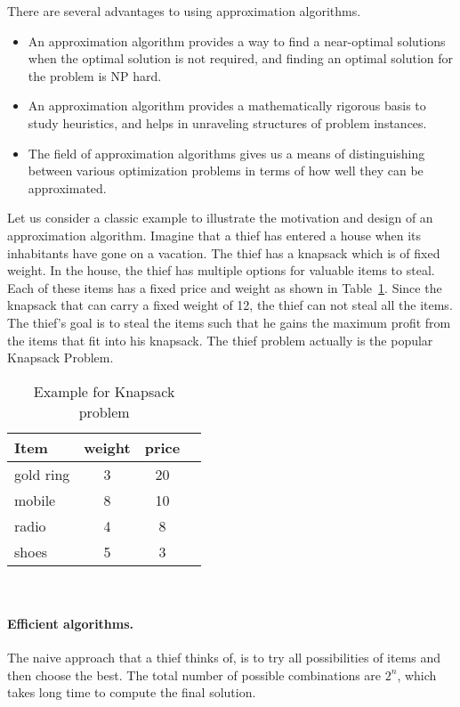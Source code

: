 There are several advantages to using approximation algorithms.
 \begin{itemize}
  \item An approximation algorithm provides a way to find a near-optimal solutions when the optimal solution is not required, and finding an optimal solution for the problem is NP hard.
  \item An approximation algorithm provides a mathematically rigorous basis to study heuristics, and helps in unraveling structures of problem instances.
  \item The field of approximation algorithms gives us a means of distinguishing between various optimization problems in terms of how well they can be approximated.
 \end{itemize} 
Let us consider a classic example to illustrate the motivation and design of an approximation algorithm. 
Imagine that a thief has entered a house when its inhabitants have gone on a vacation.
The thief has a knapsack which is of fixed weight. In the house, the thief has multiple options for valuable items to steal.
Each of these items has a fixed price and weight as shown in Table~\ref{table:knapsack}. 
Since the knapsack that can carry a fixed weight of 12, the thief can not steal all the items. 
The thief's goal is to steal the items such that he gains the maximum profit from the items that fit into his knapsack. 
The thief problem actually is the popular Knapsack Problem.
\begin{center}
\begin{table}
\centering
\begin{tabular}{ lccc } 
 \hline
 Item & weight & price \\ 
  \hline
 gold ring & 3 & 20 \\
 mobile & 8 & 10 \\
 radio & 4 & 8 \\
 shoes & 5 & 3\\
 \hline
\end{tabular}
\\[10pt]
 \caption{Example for Knapsack problem}
\label{table:knapsack}
\end{table}
\end{center}
\paragraph{Efficient algorithms.}
The naive approach that a thief thinks of, is to try all possibilities of items and then choose the best.
The total number of possible combinations are $2^n$, which takes long time to compute the final solution. 

